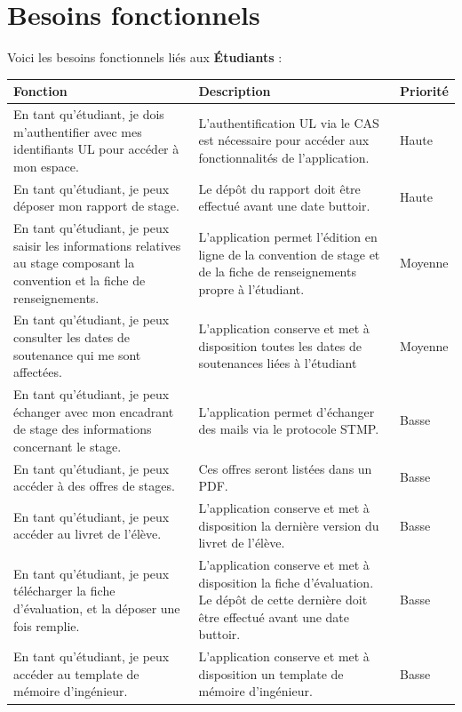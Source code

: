 \documentclass{scrreprt}
\begin{document}
\section{Besoins fonctionnels}

Voici les besoins fonctionnels liés aux \textbf{Étudiants} :
\begin{center}
\vspace {0.5cm}
\begin{tabular}{|p{5cm}|p{7cm}|p{2cm}|}
  \hline
  \textbf {Fonction} & \textbf {Description} & \textbf {Priorité} \\
  \hline
  En tant qu'étudiant, je dois m'authentifier avec mes identifiants UL pour accéder à mon espace. & L'authentification UL via le CAS est nécessaire pour accéder aux fonctionnalités de l'application. & Haute\\
  \hline
  En tant qu'étudiant, je peux déposer mon rapport de stage. & Le dépôt du rapport doit être effectué avant une date buttoir. & Haute\\ 
  \hline
  En tant qu'étudiant, je peux saisir les informations relatives au stage composant la convention et la fiche de renseignements. & L'application permet l’édition en ligne de la convention de stage et de la fiche de renseignements propre à l'étudiant. & Moyenne\\
  \hline
  En tant qu'étudiant, je peux consulter les dates de soutenance qui me sont affectées. & L'application conserve et met à disposition toutes les dates de soutenances liées à l'étudiant & Moyenne\\
  \hline
  En tant qu'étudiant, je peux échanger avec mon encadrant de stage des informations concernant le stage. & L'application permet d'échanger des mails via le protocole STMP. & Basse\\
  \hline
  En tant qu'étudiant, je peux accéder à des offres de stages. & Ces offres seront listées dans un PDF. & Basse\\
  \hline
  En tant qu'étudiant, je peux accéder au livret de l'élève. & L'application conserve et met à disposition la dernière version du livret de l'élève. & Basse\\
  \hline
  En tant qu'étudiant, je peux télécharger la fiche d'évaluation, et la déposer une fois remplie. & L'application conserve et met à disposition la fiche d'évaluation. Le dépôt de cette dernière doit être effectué avant une date buttoir. & Basse\\
  \hline  
  En tant qu'étudiant, je peux accéder au template de mémoire d'ingénieur. & L'application conserve et met à disposition un template de mémoire d'ingénieur. & Basse\\
  \hline
\end{tabular}
\end{center}
\end{document}
